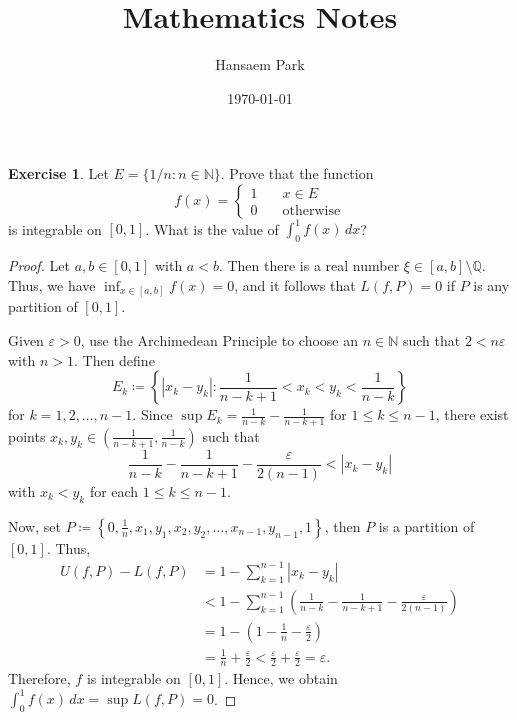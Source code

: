 \documentclass[11pt]{article}
\title{Mathematics Notes}
\author{Hansaem Park}
\date{\today}
\theoremstyle{definition}
\newtheorem{exercise}[definition]{Exercise}
\theoremstyle{plain}
\theoremstyle{remark}
\numberwithin{equation}{section}
\newcommand{\N}{\mathbb{N}}
\newcommand{\Q}{\mathbb{Q}}
\begin{document}
\begin{exercise}
Let $E=\{1/n: n\in \N\}$. Prove that the function 
\[
f(x)=
\begin{cases}
    1 & \quad x \in E \\
    0 & \quad \text{otherwise}
\end{cases}
\]
is integrable on $[0,1]$. What is the value of $\int_{0}^{1} f(x)\,dx$?
\end{exercise} 
\begin{proof}
Let $a,b \in [0,1]$ with $a<b$. Then there is a real number $\xi \in [a,b] \setminus \Q$. 
Thus, we have $\inf_{x \in [a,b]} f(x)=0$, and it follows that $L(f,P)=0$ if $P$ is any partition of $[0,1]$. 

Given $\varepsilon>0$, use the Archimedean Principle to choose an $n \in \N$ such that $2<n\varepsilon$ with $n>1$. 
Then define 
\[
E_k \coloneqq \left\{|x_k-y_k|:\frac{1}{n-k+1}<x_k<y_k<\frac{1}{n-k}\right\}
\]
for $k=1,2,\ldots,n-1$. 
Since $\sup E_k = \frac{1}{n-k} - \frac{1}{n-k+1}$ for $1 \leq k \leq n-1$, there exist points $x_k, y_k \in \left(\frac{1}{n-k+1},\frac{1}{n-k}\right)$ such that
\[
\frac{1}{n-k} - \frac{1}{n-k+1} - \frac{\varepsilon}{2(n-1)}<|x_k-y_k|
\]
with $x_k<y_k$ for each $1 \leq k \leq n-1$.

Now, set $P \coloneqq \left \{0, \frac{1}{n}, x_1, y_1, x_2, y_2, \ldots , x_{n-1}, y_{n-1}, 1 \right \}$, then $P$ is a partition of $[0,1]$. 
Thus,
\begin{align*}
U(f,P)-L(f,P) &= 1 - \sum_{k=1}^{n-1} |x_k-y_k| \\
              &< 1 - \sum_{k=1}^{n-1} \left (\frac{1}{n-k} - \frac{1}{n-k+1} - \frac{\varepsilon}{2(n-1)}\right) \\
              &= 1 - \left(1 - \frac{1}{n} - \frac{\varepsilon}{2}\right) \\
              &= \frac{1}{n} + \frac{\varepsilon}{2} < \frac{\varepsilon}{2} + \frac{\varepsilon}{2} = \varepsilon.
\end{align*}
Therefore, $f$ is integrable on $[0,1]$.
Hence, we obtain $\int_{0}^{1} f(x) \,dx = \sup L(f,P) = 0$.
\end{proof}
\end{document}
